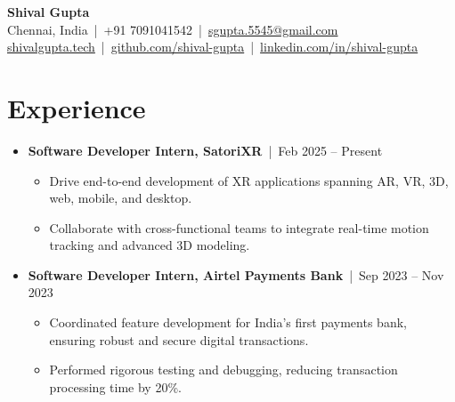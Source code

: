 \documentclass[a4paper,10pt]{article}
\newcommand{\sectionbreak}{\vspace{0.2em}}
\newcommand{\subsectionbreak}{\vspace{0em}}
\begin{document}
\begin{center}
    {\fontsize{24pt}{28pt}\selectfont \textbf{Shival Gupta}} \\
    \vspace{0.2cm}
    \small Chennai, India \,|\, +91 7091041542 \,|\, \href{mailto:sgupta.5545@gmail.com}{\textcolor{accentcolor}{sgupta.5545@gmail.com}} \\
    \href{https://shivalgupta.tech/}{\textcolor{accentcolor}{shivalgupta.tech}} \,|\, \href{https://github.com/shival-gupta/}{\textcolor{accentcolor}{github.com/shival-gupta}} \,|\, \href{https://linkedin.com/in/shival-gupta/}{\textcolor{accentcolor}{linkedin.com/in/shival-gupta}}
\end{center}

\vspace{-0.3cm}

\section{Experience}
\begin{itemize}[noitemsep, topsep=0pt]
    \item \textbf{Software Developer Intern, SatoriXR} \,|\, Feb 2025 – Present
        \subsectionbreak
        \begin{itemize}
            \item Drive end-to-end development of XR applications spanning AR, VR, 3D, web, mobile, and desktop.
            \item Collaborate with cross-functional teams to integrate real-time motion tracking and advanced 3D modeling.
        \end{itemize}
        \subsectionbreak
    \item \textbf{Software Developer Intern, Airtel Payments Bank} \,|\, Sep 2023 – Nov 2023
        \subsectionbreak
        \begin{itemize}
            \item Coordinated feature development for India’s first payments bank, ensuring robust and secure digital transactions.
            \item Performed rigorous testing and debugging, reducing transaction processing time by 20\%.
        \end{itemize}
\end{itemize}

\sectionbreak

\end{document}
